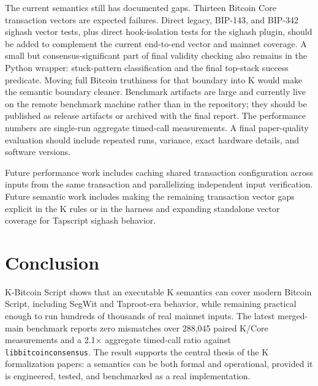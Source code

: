 \documentclass[conference]{IEEEtran}
\newcommand{\bitcoin}{Bitcoin\xspace}
\begin{document}
The current semantics still has documented gaps.  Thirteen Bitcoin Core
transaction vectors are expected failures.  Direct legacy, BIP-143, and BIP-342
sighash vector tests, plus direct hook-isolation tests for the sighash plugin,
should be added to complement the current end-to-end vector and mainnet
coverage.  A small but consensus-significant part of final validity checking
also remains in the Python wrapper: stuck-pattern classification and the final
top-stack success predicate.  Moving full Bitcoin truthiness for that boundary
into K would make the semantic boundary cleaner.  Benchmark artifacts are large
and currently live on the
remote benchmark machine rather than in the repository; they should be published
as release artifacts or archived with the final report.  The performance
numbers are single-run aggregate timed-call measurements.  A final paper-quality
evaluation should include repeated runs, variance, exact hardware details, and
software versions.

Future performance work includes caching shared transaction configuration
across inputs from the same transaction and parallelizing independent input
verification.  Future semantic work includes making the remaining transaction
vector gaps explicit in the K rules or in the harness and expanding standalone
vector coverage for Tapscript sighash behavior.

\section{Conclusion}

K-Bitcoin Script shows that an executable K semantics can cover modern
\bitcoin Script, including SegWit and Taproot-era behavior, while remaining
practical enough to run hundreds of thousands of real mainnet inputs.  The
latest merged-main benchmark reports zero mismatches over 288,045 paired K/Core
measurements and a 2.1$\times$ aggregate timed-call ratio against
\texttt{libbitcoinconsensus}.  The result supports the central thesis of the K
formalization papers: a semantics can be both formal and operational, provided
it is engineered, tested, and benchmarked as a real implementation.
\end{document}
